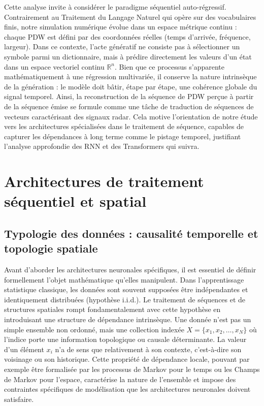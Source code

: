 Cette analyse invite à considérer le paradigme séquentiel auto-régressif. Contrairement au Traitement du Langage Naturel qui opère sur des vocabulaires finis, notre simulation numérique évolue dans un espace métrique continu : chaque PDW est défini par des coordonnées réelles (temps d'arrivée, fréquence, largeur). Dans ce contexte, l'acte génératif ne consiste pas à sélectionner un symbole parmi un dictionnaire, mais à prédire directement les valeurs d'un état dans un espace vectoriel continu $\mathbb{R}^n$. Bien que ce processus s'apparente mathématiquement à une régression multivariée, il conserve la nature intrinsèque de la génération : le modèle doit bâtir, étape par étape, une cohérence globale du signal temporel. Ainsi, la reconstruction de la séquence de PDW perçue à partir de la séquence émise se formule comme une tâche de traduction de séquences de vecteurs caractérisant des signaux radar. Cela motive l'orientation de notre étude vers les architectures spécialisées dans le traitement de séquence, capables de capturer les dépendances à long terme comme le pistage temporel, justifiant l'analyse approfondie des RNN et des Transformers qui suivra.




\section{Architectures de traitement séquentiel et spatial}

\subsection{Typologie des données : causalité temporelle et topologie spatiale}
Avant d'aborder les architectures neuronales spécifiques, il est essentiel de définir formellement l'objet mathématique qu'elles manipulent. Dans l'apprentissage statistique classique, les données sont souvent supposées être indépendantes et identiquement distribuées (hypothèse i.i.d.). Le traitement de séquences et de structures spatiales rompt fondamentalement avec cette hypothèse en introduisant une structure de dépendance intrinsèque. Une donnée n'est pas un simple ensemble non ordonné, mais une collection indexée $X = \{x_1, x_2, \dots, x_N\}$ où l'indice porte une information topologique ou causale déterminante. La valeur d'un élément $x_i$ n'a de sens que relativement à son contexte, c'est-à-dire son voisinage ou son historique. Cette propriété de dépendance locale, pouvant par exemple être formalisée par les processus de Markov pour le temps ou les Champs de Markov pour l'espace, caractérise la nature de l'ensemble et impose des contraintes spécifiques de modélisation que les architectures neuronales doivent satisfaire.


